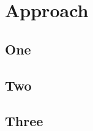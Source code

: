 
\chapter{Approach}
\begin{spacing}{1.5}
\setlength{\parskip}{0.3in}


\section{One}


\section{Two}


\section{Three}


\end{spacing}
\newpage
